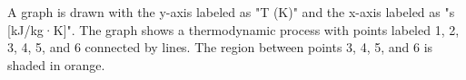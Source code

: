 A graph is drawn with the y-axis labeled as "T (K)" and the x-axis labeled as "s [kJ/kg·K]". The graph shows a thermodynamic process with points labeled 1, 2, 3, 4, 5, and 6 connected by lines. The region between points 3, 4, 5, and 6 is shaded in orange.